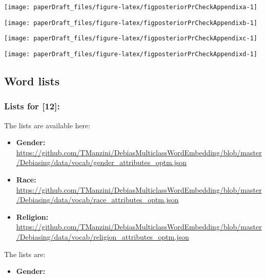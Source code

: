 \documentclass[
  12pt,
  dvipsnames,enabledeprecatedfontcommands]{scrartcl}
\providecommand{\tightlist}{%
  \setlength{\itemsep}{0pt}\setlength{\parskip}{0pt}}
\begin{document}
\begin{center}\texttt{[image: paperDraft\_files/figure-latex/figposteriorPrCheckAppendixa-1]} \end{center}

\begin{center}\texttt{[image: paperDraft\_files/figure-latex/figposteriorPrCheckAppendixb-1]} \end{center}

\begin{center}\texttt{[image: paperDraft\_files/figure-latex/figposteriorPrCheckAppendixc-1]} \end{center}

\begin{center}\texttt{[image: paperDraft\_files/figure-latex/figposteriorPrCheckAppendixd-1]} \end{center}

\hypertarget{word-lists}{%
\subsection{Word lists}\label{word-lists}}

\hypertarget{lists-for-manzini2019blacktocriminal}{%
\subsubsection{Lists for
{[}12{]}:}\label{lists-for-manzini2019blacktocriminal}}

\label{appendix:manzini_word_lists} The lists are available here:

\begin{itemize}
\item
  \textbf{Gender:}
  \url{https://github.com/TManzini/DebiasMulticlassWordEmbedding/blob/master/Debiasing/data/vocab/gender_attributes_optm.json}
\item
  \textbf{Race:}
  \url{https://github.com/TManzini/DebiasMulticlassWordEmbedding/blob/master/Debiasing/data/vocab/race_attributes_optm.json}
\item
  \textbf{Religion:}
  \url{https://github.com/TManzini/DebiasMulticlassWordEmbedding/blob/master/Debiasing/data/vocab/religion_attributes_optm.json}
\end{itemize}

The lists are:

\begin{itemize}
\tightlist
\item
  \textbf{Gender:}
\end{itemize}
\end{document}
